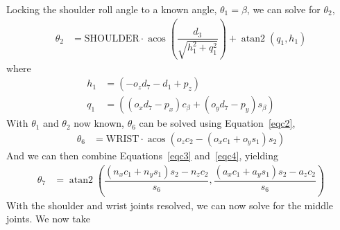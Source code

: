 \documentclass[onecolumn,10pt]{jhwhw}
\DeclareMathOperator{\atantwo}{atan2}
\DeclareMathOperator{\acos}{acos}
\begin{document}
Locking the shoulder roll angle to a known angle, $\theta_1 = \beta$, we can solve for $\theta_2$,
\begin{align}
\theta_2 &= \mbox{SHOULDER} \cdot \acos \left( \dfrac{d_3}{\sqrt{h_1^2 + q_1^2}} \right) + \atantwo(q_1,h_1)
\end{align}
where
\begin{align}
h_1 &= \left(-o_{z} d_7 - d_{1} + p_{z} \right) \\
q_1 &= \left( \left( o_{x} d_7 - p_{x} \right) c_{\beta} + \left( o_{y} d_7 - p_{y} \right) s_{\beta} \right)
\end{align}
With $\theta_1$ and $\theta_2$ now known, $\theta_6$ can be solved using Equation~\ref{eqc2},
\begin{align}
\theta_6 &= \mbox{WRIST} \cdot \acos \left(o_{z} c_2 - \left( o_{x} c_1 + o_{y} s_1 \right) s_2 \right)
\end{align}
And we can then combine Equations~\ref{eqc3} and~\ref{eqc4}, yielding
\begin{align}
\theta_7 &= \atantwo \left( \dfrac{\left(n_{x} c_1 + n_{y} s_1\right) s_2 - n_{z} c_2}{s_6},
\dfrac{\left(a_{x} c_1 + a_{y} s_1\right) s_2 - a_{z} c_2}{s_6}\right)
\end{align}
With the shoulder and wrist joints resolved, we can now solve for the middle joints. We now take
\end{document}
